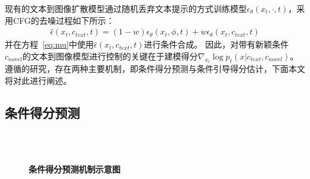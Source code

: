 现有的文本到图像扩散模型通过随机丢弃文本提示的方式训练模型$\epsilon_{\theta}(x_t, \cdot, t)$，采用CFG的去噪过程如下所示：
\begin{align}
\label{eq:cfg}
    \hat\epsilon(x_t, c_{text}, t)=(1-w)\epsilon_{\theta}(x_t, \phi, t)+w\epsilon_{\theta}(x_t, c_{text}, t)
\end{align}
并在方程~\ref{eq:mu}中使用$\hat\epsilon(x_t, c_{text}, t)$进行条件合成。
因此，对带有新颖条件$c_{novel}$的文本到图像模型进行控制的关键在于建模得分$\nabla_{x_{t}}\log p_t(x|c_{text},c_{novel})$。遵循\cite{dhariwal2021diffusion,zhang2023text}的研究，存在两种主要机制，即条件得分预测与条件引导得分估计，下面本文将对此进行阐述。

\subsection{条件得分预测}
\label{sec:csp}

\begin{figure}[htbp]
    \centering
    \\
    \\
    \caption{\textbf{条件得分预测机制示意图}}
    \label{fig:csp}
\end{figure}

